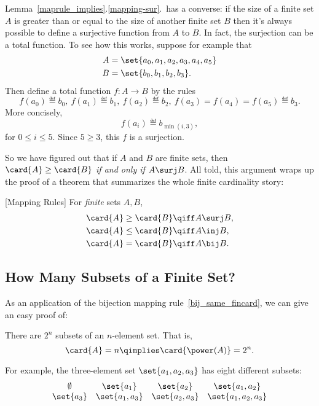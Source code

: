 Lemma~\ref{maprule_implies}.\ref{mapping-sur}.\ has a converse: if the
size of a finite set $A$ is greater than or equal to the size of
another finite set $B$ then it's always possible to define a
surjective function from $A$ to $B$.  In fact, the surjection can be a
total function.  To see how this works, suppose for example that
\begin{align*}
A & =\set{a_0,a_1,a_2,a_3,a_4,a_5}\\ B & =\set{b_0,b_1,b_2,b_3}.
\end{align*}
Then define a total function $f:A\to B$ by the rules
\[
f(a_0) \eqdef b_0,\ f(a_1) \eqdef b_1,\ f(a_2) \eqdef b_2,\ f(a_3)=
f(a_4)=f(a_5) \eqdef b_3.
\]
More concisely,
\[
f(a_i) \eqdef b_{\min(i,3)},
\]
for $0 \le i \le 5$.  Since $5 \geq 3$, this $f$ is a surjection.
\iffalse In fact, if $A$ and $B$ are finite sets of the same size,
then we could also define a bijection from $A$ to $B$ by this method.
\fi 

So we have figured out that if $A$ and $B$ are finite sets, then
$\card{A} \geq \card{B}$ \emph{if and only if} $A \surj B$.  All told,
this argument wraps up the proof of a theorem that summarizes the
whole finite cardinality story:
\begin{theorem}\label{maprul_thm}
[Mapping Rules] \mbox{} For \emph{finite} sets $A,B$,
\begin{align}
\card{A} \geq \card{B} & \qiff A \surj B,\label{sur_ge_fincard}\\
\card{A} \leq \card{B} & \qiff A \inj B,\label{inj_le_fincard}\\
\card{A} = \card{B} & \qiff A \bij B.\label{bij_same_fincard}
\end{align}
\end{theorem}%
%

\subsection{How Many Subsets of a Finite Set?}
As an application of the bijection mapping%
rule~\eqref{bij_same_fincard}, we can give an easy proof of:
\begin{theorem}\label{powset_fincard}
There are $2^n$ subsets of an $n$-element set.  That is,
\[
\card{A} = n \qimplies \card{\power(A)} = 2^n.
\]
\end{theorem}

For example, the three-element set $\set{a_1, a_2, a_3}$ has eight
different subsets: %
\[
\begin{array}{cccc}
\emptyset & \set{a_1} & \set{a_2} & \set{a_1, a_2} \\ \set{a_3} &
\set{a_1, a_3} & \set{a_2, a_3} & \set{a_1, a_2, a_3}
\end{array}
\]

